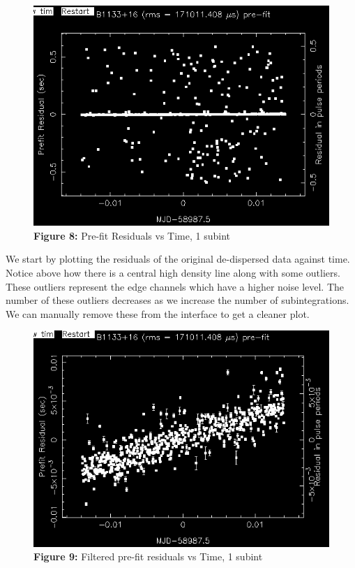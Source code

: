\documentclass{article_saj}
\begin{document}
\begin{figure}[h!]
  \begin{center}
    \includegraphics[width=0.9\columnwidth]{Plots/tempo1_edit.png}
    \caption*{\textbf{Figure 8:} Pre-fit Residuals vs Time, 1 subint}
  \end{center}
\end{figure}

We start by plotting the residuals of the original de-dispersed data against time. Notice above how there is a central high density line along with some outliers. These outliers represent the edge channels which have a higher noise level. The number of these outliers decreases as we increase the number of subintegrations. We can manually remove these from the interface to get a cleaner plot.

\begin{figure}[H]
  \begin{center}
    \includegraphics[width=0.9\columnwidth]{Plots/tempo2_edit.png}
    \caption*{\textbf{Figure 9:} Filtered pre-fit residuals vs Time, 1 subint}
  \end{center}
\end{figure}
\end{document}

